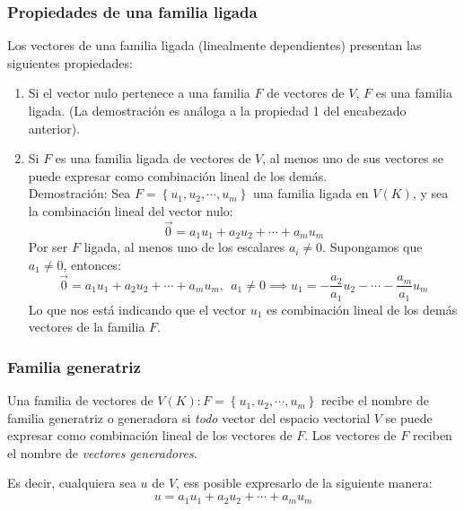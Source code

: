 \subsubsection{Propiedades de una familia ligada}

Los vectores de una familia ligada (linealmente dependientes) presentan las siguientes propiedades:
\begin{enumerate}
  \item Si el vector nulo pertenece a una familia \(F\) de vectores de \(V\), \(F\) es una familia ligada. (La demostración es análoga a la propiedad 1 del encabezado anterior).
  \item Si \(F\) es una familia ligada de vectores de \(V\), al menos uno de sus vectores se puede expresar como combinación lineal de los demás. \\ Demostración: Sea \(F=\left\{u_1, u_2, \cdots, u_m\right\}\) una familia ligada en \(V(K)\), y sea la combinación lineal del vector nulo:\[
    \vec{0} = a_1 u_1 + a_2 u_2 + \cdots + a_m u_m
  \]
  Por ser \(F\) ligada, al menos uno de los escalares \(a_i \neq 0\). Supongamos que \(a_1 \neq 0\), entonces: \[
    \vec{0} = a_1 u_1 + a_2 u_2 + \cdots + a_m u_m, ~~ a_1 \neq 0 \implies u_1 = -\frac{a_2}{a_1}u_2 - \cdots - \frac{a_m}{a_1}u_m
  \]
  Lo que nos está indicando que el vector \(u_1\) es combinación lineal de los demás vectores de la familia \(F\).
\end{enumerate}

\subsubsection{Familia generatriz}

Una familia de vectores de \(V(K): F=\left\{u_1,u_2,\cdots,u_m\right\}\) recibe el nombre de familia generatriz o generadora si \textit{todo} vector del espacio vectorial \(V\) se puede expresar como combinación lineal de los vectores de \(F\). Los vectores de \(F\) reciben el nombre de \textit{vectores generadores}.

Es decir, cualquiera sea \(u\) de \(V\), ess posible expresarlo de la siguiente manera:\[
  u = a_1 u_1 + a_2 u_2 + \cdots + a_m u_m
\]


\label{teo:generador_li}

